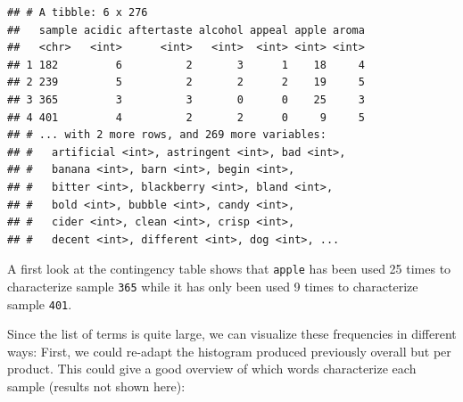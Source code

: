 \documentclass[
]{krantz}
\begin{document}
\begin{verbatim}
## # A tibble: 6 x 276
##   sample acidic aftertaste alcohol appeal apple aroma
##   <chr>   <int>      <int>   <int>  <int> <int> <int>
## 1 182         6          2       3      1    18     4
## 2 239         5          2       2      2    19     5
## 3 365         3          3       0      0    25     3
## 4 401         4          2       2      0     9     5
## # ... with 2 more rows, and 269 more variables:
## #   artificial <int>, astringent <int>, bad <int>,
## #   banana <int>, barn <int>, begin <int>,
## #   bitter <int>, blackberry <int>, bland <int>,
## #   bold <int>, bubble <int>, candy <int>,
## #   cider <int>, clean <int>, crisp <int>,
## #   decent <int>, different <int>, dog <int>, ...
\end{verbatim}

A first look at the contingency table shows that \texttt{apple} has been used 25 times to characterize sample \texttt{365} while it has only been used 9 times to characterize sample \texttt{401}.

Since the list of terms is quite large, we can visualize these frequencies in different ways: First, we could re-adapt the histogram produced previously overall but per product. This could give a good overview of which words characterize each sample (results not shown here):
\end{document}
